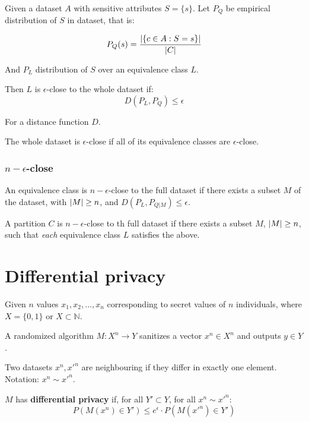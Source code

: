 \documentclass[a4paper]{scrreprt}
\DeclarePairedDelimiter\abs{\lvert}{\rvert}
\begin{document}
Given a dataset $A$ with sensitive attributes $S = \{s\}$. Let $P_Q$ be
empirical distribution of $S$ in dataset, that is:

\[
		P_Q(s) = \frac{\abs{\{c \in A : S = s\}}}{\abs{C}}
\]

And $P_L$ distribution of $S$ over an equivalence class $L$.

Then $L$ is $\epsilon$-close to the whole dataset if:
\[
		D(P_L, P_Q) \leq \epsilon
\]

For a distance function $D$.

The whole dataset is $\epsilon$-close if all of its equivalence classes are
$\epsilon$-close.

\subsection{$n-\epsilon$-close}

An equivalence class is $n-\epsilon$-close to the full dataset if there exists
a subset $M$ of the dataset, with $\abs{M} \geq n$, and $D(P_L, P_{Q | M}) \leq
\epsilon$.

A partition $C$ is $n-\epsilon$-close to th full dataset if there exists a
subset $M$, $\abs{M} \geq n$, such that \emph{each} equivalence class $L$
satisfies the above.

\chapter{Differential privacy}

Given $n$ values $x_1, x_2, \ldots, x_n$ corresponding to secret values of $n$
individuals, where $X = \{0, 1\}$ or $X \subset \mathbb{N}$.

A randomized algorithm $M : X^n \rightarrow Y$ sanitizes a vector $x^n \in X^n$
and outputs $y \in Y$.

Two datasets $x^n, x'^n$ are neighbouring if they differ in exactly one
element. Notation: $x^n \sim x'^n$.

$M$ has \textbf{differential privacy} if, for all $Y' \subset Y$, for all $x^n \sim x'^n$:
\[
		P(M(x^n) \in Y') \leq e^\epsilon \cdot P(M(x'^n) \in Y')
\]

\printbibliography
\end{document}
